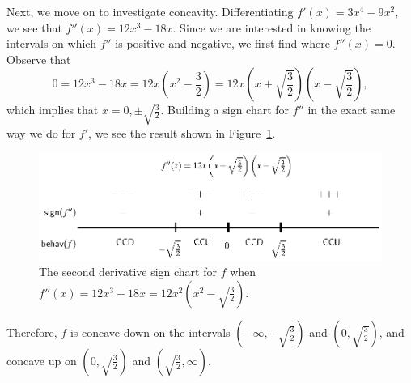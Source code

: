 Next, we move on to investigate concavity.  Differentiating $f'(x) = 3x^4 - 9x^2$, we see that $f''(x) = 12x^3 - 18x$.  Since we are interested in knowing the intervals on which $f''$ is positive and negative, we first find where $f''(x) = 0$.  Observe that
$$0 = 12x^3 - 18x = 12x\left(x^2 - \frac{3}{2}\right) = 12x\left(x+\sqrt{\frac{3}{2}}\right)\left(x-\sqrt{\frac{3}{2}}\right),$$
which implies that $x = 0, \pm\sqrt{\frac{3}{2}}$.  Building a sign chart for $f''$ in the exact same way we do for $f'$, we see the result shown in Figure~\ref{F:3.1.signchart3}.
\begin{figure}[h]
\begin{center}
\includegraphics{figures/3_1_signchart3.eps}
\caption{The second derivative sign chart for $f$ when $f''(x) = 12x^3-18x = 12x^2\left(x^2-\sqrt{\frac{3}{2}}\right)$.} \label{F:3.1.signchart3}
\end{center}
\end{figure}
Therefore, $f$ is concave down on the intervals $(-\infty, -\sqrt{\frac{3}{2}})$ and $(0, \sqrt{\frac{3}{2}})$, and concave up on $(0, \sqrt{\frac{3}{2}})$ and $(\sqrt{\frac{3}{2}}, \infty)$.

